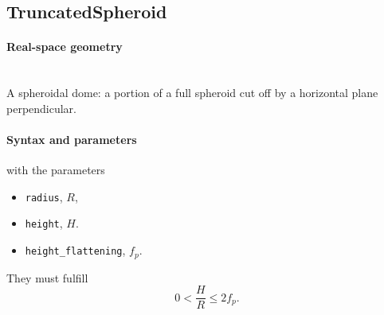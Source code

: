\clearpage
\subsection{TruncatedSpheroid} \label{sec:TruncatedSpheroid}

\paragraph{Real-space geometry}\strut\\
A spheroidal dome: a portion of a full spheroid cut off
by a horizontal plane perpendicular.

\begin{figure}[h]
\hfill
{}
\hfill
{}
\hfill
\end{figure}

\paragraph{Syntax and parameters}
\begin{quote}
\end{quote}
with the parameters
\begin{itemize}
\item \texttt{radius}, $R$,
\item \texttt{height}, $H$.
\item \texttt{height\_flattening}, $f_p$.
\end{itemize}
They must fulfill
\begin{displaymath}
  0< \dfrac{H}{R}\le 2f_p.
\end{displaymath}

